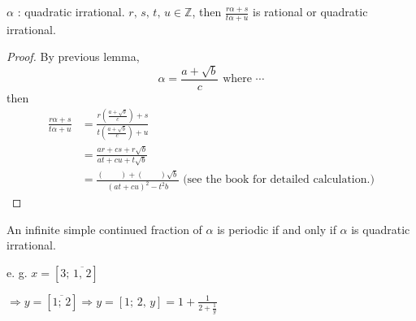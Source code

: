 \begin{lemma}
    $\alpha$ : quadratic irrational. $r,\,s,\,t,\,u \in \mathbb{Z}$, then
    $\frac{r\alpha+s}{t\alpha+u}$ is rational or quadratic irrational.    
\end{lemma}
\begin{proof}
    By previous lemma,
    \[
        \alpha=\frac{a+\sqrt{b}}{c} \mbox{ where } \cdots
    \]
    then
    \begin{align*}
        \frac{r\alpha+s}{t\alpha+u} &= \frac{r\left(\frac{a+\sqrt{b}}{c}\right)+s}{t\left(\frac{a+\sqrt{b}}{c}\right)+u} \\
        &= \frac{ar + cs + r\sqrt{b}}{at + cu + t\sqrt{b}} \\
        &= \frac{\left(\qquad\right)+\left(\qquad\right)\sqrt{b}}{\left(at+cu\right)^2-t^2b} \mbox{ (see the book for detailed calculation.)}
    \end{align*}
\end{proof}

\begin{theorem}
    An infinite simple continued fraction of $\alpha$ is periodic if and only if
    $\alpha$ is quadratic irrational.
\end{theorem}

e. g. $x=\left[ 3;\,\overline{1,\,2} \right]$

$\Rightarrow y=\left[ \overline{1;\,2} \right] \Rightarrow y = \left[ 1;\,2,\,y \right] = 1 + \frac{1}{2 + \frac{1}{y}}$


